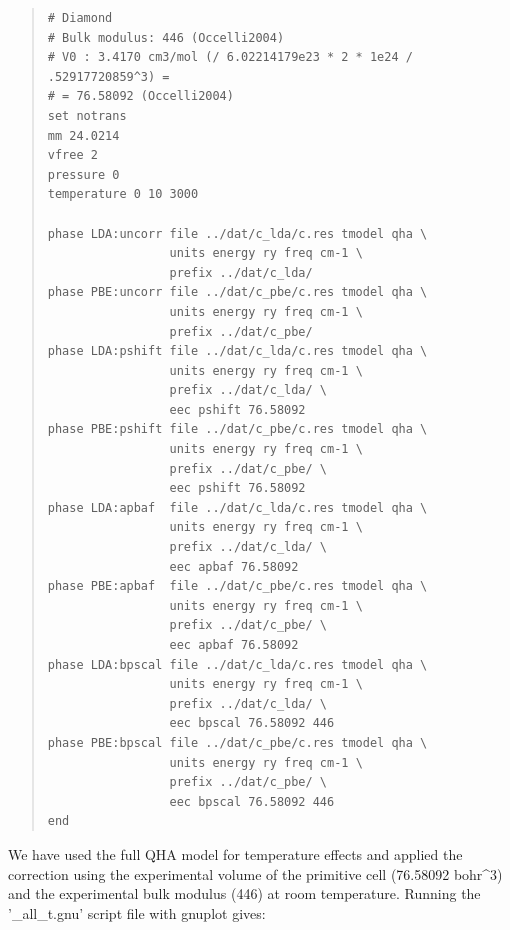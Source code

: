 \documentclass[a4paper]{article}
\begin{document}
\begin{quote}
\begin{verbatim}
# Diamond
# Bulk modulus: 446 (Occelli2004)
# V0 : 3.4170 cm3/mol (/ 6.02214179e23 * 2 * 1e24 / .52917720859^3) =
# = 76.58092 (Occelli2004)
set notrans
mm 24.0214
vfree 2
pressure 0
temperature 0 10 3000

phase LDA:uncorr file ../dat/c_lda/c.res tmodel qha \
                 units energy ry freq cm-1 \
                 prefix ../dat/c_lda/
phase PBE:uncorr file ../dat/c_pbe/c.res tmodel qha \
                 units energy ry freq cm-1 \
                 prefix ../dat/c_pbe/
phase LDA:pshift file ../dat/c_lda/c.res tmodel qha \
                 units energy ry freq cm-1 \
                 prefix ../dat/c_lda/ \
                 eec pshift 76.58092
phase PBE:pshift file ../dat/c_pbe/c.res tmodel qha \
                 units energy ry freq cm-1 \
                 prefix ../dat/c_pbe/ \
                 eec pshift 76.58092
phase LDA:apbaf  file ../dat/c_lda/c.res tmodel qha \
                 units energy ry freq cm-1 \
                 prefix ../dat/c_lda/ \
                 eec apbaf 76.58092
phase PBE:apbaf  file ../dat/c_pbe/c.res tmodel qha \
                 units energy ry freq cm-1 \
                 prefix ../dat/c_pbe/ \
                 eec apbaf 76.58092
phase LDA:bpscal file ../dat/c_lda/c.res tmodel qha \
                 units energy ry freq cm-1 \
                 prefix ../dat/c_lda/ \
                 eec bpscal 76.58092 446
phase PBE:bpscal file ../dat/c_pbe/c.res tmodel qha \
                 units energy ry freq cm-1 \
                 prefix ../dat/c_pbe/ \
                 eec bpscal 76.58092 446
end
\end{verbatim}
\end{quote}

We have used the full QHA model for temperature effects and applied
the correction using the experimental volume of the primitive cell
(76.58092 bohr\textasciicircum{}3) and the experimental bulk modulus (446) at room
temperature. Running the '\_all\_t.gnu' script file with gnuplot gives:

\noindent{}
\end{document}
